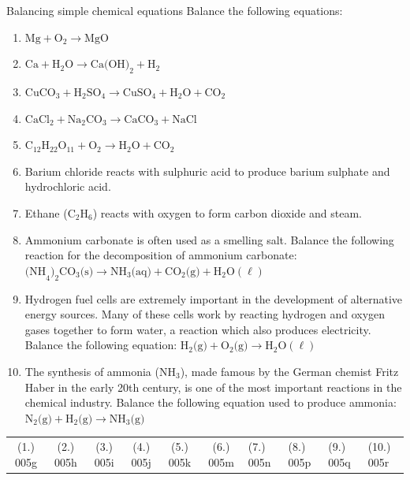             \begin{exercises}{ Balancing simple chemical equations }
            \nopagebreak \noindent 
 \label{m38726*id65193}Balance the following equations:
 \label{m38726*id65199}\begin{enumerate}[noitemsep, label=\textbf{\arabic*}. ] 
\item  $\text{Mg} + \text{O}_{2} \to \text{MgO}$
\item ${\text{Ca}}+{\text{H}}_{2}\text{O} \to \text{Ca(OH)}_{2} + \text{H}_{2}$
\item ${\text{CuCO}}_{3} + {\text{H}}_{2}{\text{SO}}_{4} \to \text{CuSO}_{4} + {\text{H}}_{2}\text{O} + {\text{CO}}_{2}$
\item $\text{CaCl}_{2} + {\text{Na}}_{2}{\text{CO}}_{3} \to \text{CaCO}_{3} + {\text{NaCl}}$        
\item ${\text{C}}_{12}{\text{H}}_{22}{\text{O}}_{11} + \text{O}_{2} \to \text{H}_{2}\text{O} + \text{CO}_{2}$
\item Barium chloride reacts with sulphuric acid to produce barium sulphate and hydrochloric acid.
\item Ethane (${\text{C}}_{2}{\text{H}}_{6}$) reacts with oxygen to form carbon dioxide and steam.
\item Ammonium carbonate is often used as a smelling salt. Balance the following reaction for the decomposition of ammonium carbonate: ${\text{(NH}}_{4}\text{)}_{2}{\text{CO}}_{3} \text{(s)} \to {\text{NH}}_{3}\text{(aq)} + {\text{CO}}_{2} \text{(g)} + \text{H}_{2}\text{O} (\ell)$ 
\item Hydrogen fuel cells are extremely important in the development of alternative energy sources. Many of these cells work by reacting hydrogen and oxygen gases together to form water, a reaction which also produces electricity. Balance the following equation: $\text{H}_{2} \text{(g)} + \text{O}_{2} \text{(g)} \to \text{H}_{2}\text{O} (\ell)$    
\item The synthesis of ammonia ($\text{NH}_{3}$), made famous by the German chemist Fritz Haber in the early 20th century, is one of the most important reactions in the chemical industry. Balance the following equation used to produce ammonia:
$\text{N}_{2} \text{(g)} + \text{H}_{2} \text{(g)} \to \text{NH}_{3} \text{(g)}$
\end{enumerate}
\practiceinfo
\par 
 \par \begin{tabular}[h]{cccccc}
 (1.) 005g  &  (2.) 005h   &  (3.) 005i  &  (4.) 005j  &  (5.) 005k  &  (6.) 005m  &  (7.) 005n  &  (8.) 005p  &  (9.) 005q  &  (10.) 005r  & \end{tabular}
\end{exercises}
